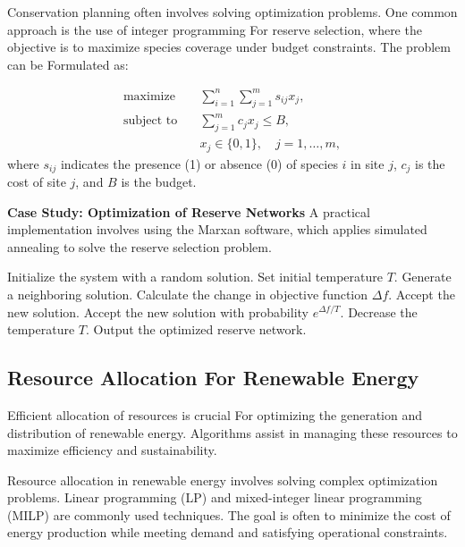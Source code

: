 \documentclass[12pt]{book} %
\begin{document}
Conservation planning often involves solving optimization problems. One common approach is the use of integer programming For reserve selection, where the objective is to maximize species coverage under budget constraints. The problem can be Formulated as:

\begin{align}
    \text{maximize} \quad & \sum_{i=1}^{n} \sum_{j=1}^{m} s_{ij} x_j, \\
    \text{subject to} \quad & \sum_{j=1}^{m} c_j x_j \leq B, \\
    & x_j \in \{0, 1\}, \quad j = 1, \ldots, m,
\end{align}
where $s_{ij}$ indicates the presence (1) or absence (0) of species $i$ in site $j$, $c_j$ is the cost of site $j$, and $B$ is the budget.

\textbf{Case Study: Optimization of Reserve Networks}
A practical implementation involves using the Marxan software, which applies simulated annealing to solve the reserve selection problem.
\FloatBarrier
\begin{algorithm}
\caption{Simulated Annealing For Reserve Selection}
\begin{algorithmic}[1]
\State Initialize the system with a random solution.
\State Set initial temperature $T$.
    \State Generate a neighboring solution.
    \State Calculate the change in objective function $\Delta f$.
        \State Accept the new solution.
    \Else
        \State Accept the new solution with probability $e^{\Delta f / T}$.
    \EndIf
    \State Decrease the temperature $T$.
\EndFor
\State Output the optimized reserve network.
\end{algorithmic}
\end{algorithm}

\subsection{Resource Allocation For Renewable Energy}
Efficient allocation of resources is crucial For optimizing the generation and distribution of renewable energy. Algorithms assist in managing these resources to maximize efficiency and sustainability.

Resource allocation in renewable energy involves solving complex optimization problems. Linear programming (LP) and mixed-integer linear programming (MILP) are commonly used techniques. The goal is often to minimize the cost of energy production while meeting demand and satisfying operational constraints.
\end{document}

